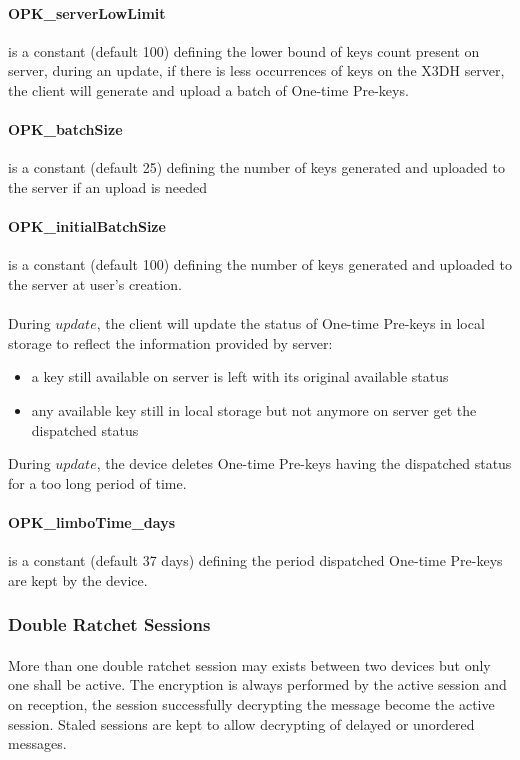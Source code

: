 \documentclass[a4paper,11pt]{article}
\begin{document}
      \paragraph{OPK\_serverLowLimit}is a constant (default 100) defining the lower bound of keys count present on server, during an update, if there is less occurrences of keys on the X3DH server, the client will generate and upload a batch of One-time Pre-keys.
      \paragraph{OPK\_batchSize} is a constant (default 25) defining the number of keys generated and uploaded to the server if an upload is needed
      \paragraph{OPK\_initialBatchSize}is a constant (default 100) defining the number of keys generated and uploaded to the server at user's creation.
      \paragraph{}During $update$, the client will update the status of One-time Pre-keys in local storage to reflect the information provided by server:
      \begin{itemize}
      \item a key still available on server is left with its original available status
      \item any available key still in local storage but not anymore on server get the dispatched status
      \end{itemize}
      During $update$, the device deletes One-time Pre-keys having the dispatched status for a too long period of time.
      \paragraph{OPK\_limboTime\_days} is a constant (default 37 days) defining the period dispatched One-time Pre-keys are kept by the device.

    \subsubsection{Double Ratchet Sessions}
      \paragraph{}More than one double ratchet session may exists between two devices but only one shall be active. The encryption is always performed by the active session and on reception, the session successfully decrypting the message become the active session.
      Staled sessions are kept to allow decrypting of delayed or unordered messages.
\end{document}
